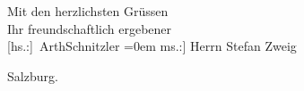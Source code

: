 \pstart
           Mit den herzlichsten Grüssen{\\[\baselineskip]}Ihr freundschaftlich ergebener{\\[\baselineskip]}\spacefill\mbox{{[}hs.:{]} ArthSchnitzler}\pend
           \leftskip=0em{}
\pstart
           \noindent{}{[}ms.:{]} Herrn Stefan Zweig\pend
           
\pstart
           \noindent{}Salzburg.\pend
           \endnumbering{}  \newcommand{\dateiname}{L03734}\newcommand{\titel}{Arthur Schnitzler an Stefan Zweig, 4. 11. 1929}\newcommand{\editorInnen}{Selma Jahnke und Martin Anton Müller}
